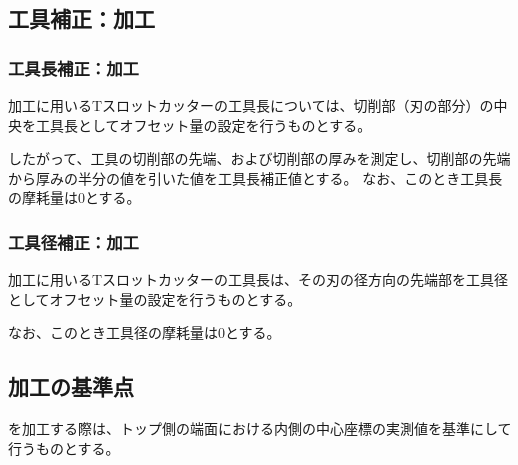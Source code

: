 \subsection{工具補正：\dimple 加工}

\subsubsection{工具長補正：\dimple 加工}
\dimple 加工に用いるTスロットカッターの工具長については、切削部（刃の部分）の中央を工具長としてオフセット量の設定を行うものとする。

したがって、工具の切削部の先端、および切削部の厚みを測定し、切削部の先端から厚みの半分の値を引いた値を工具長補正値とする。
なお、このとき工具長の摩耗量は0とする。

\subsubsection{工具径補正：\dimple 加工}
\dimple 加工に用いるTスロットカッターの工具長は、その刃の径方向の先端部を工具径としてオフセット量の設定を行うものとする。

なお、このとき工具径の摩耗量は0とする。


\subsection{\dimple 加工の基準点}
\dimple を加工する際は、トップ側の端面における内側の中心座標の実測値を基準にして行うものとする。


